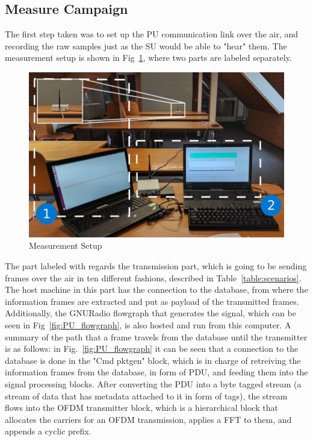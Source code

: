 \subsection{Measure Campaign}\label{ch:measure}
The first step taken was to set up the \ac{PU} communication link over the air, and recording the raw samples just as the \ac{SU} would be able to "hear" them. The measurement setup is shown in Fig~\ref{fig:measurement}, where two parts are labeled separately.

\begin{figure}[!htb]
    \centering
    \includegraphics[width=0.5\linewidth]{figures/mod}
    \caption{Measurement Setup}
    \label{fig:measurement}
\end{figure}

The part labeled with  regards the transmission part, which is going to be sending frames over the air in ten different fashions, described in Table~\ref{table:scenarios}.  The host machine in this part has the connection to the database, from where the information frames are extracted and put as payload of the transmitted frames. Additionally, the GNURadio flowgraph that generates the signal, which can be seen in Fig~\ref{fig:PU_flowgraph}, is also hosted and run from this computer. A summary of the path that a frame travels from the database until the transmitter is as follows: in Fig.~\ref{fig:PU_flowgraph} it can be seen that a connection to the database is done in the "Cmd pktgen" block, which is in charge of retreiving the information frames from the database, in form of \ac{PDU}, and feeding them into the signal processing blocks. After converting the \ac{PDU} into a byte tagged stream (a stream of data that has metadata attached to it in form of tags), the stream flows into the \ac{OFDM} transmitter block, which is a hierarchical block that allocates the carriers for an \ac{OFDM} transmission, applies a \ac{FFT} to them, and appends a cyclic prefix.

